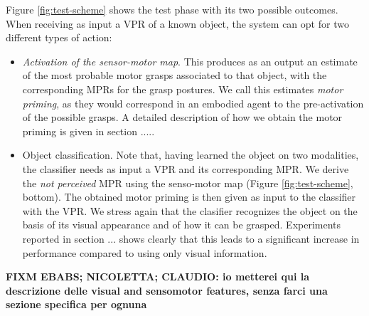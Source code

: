 Figure \ref{fig:test-scheme} shows the test phase with its two possible outcomes. When receiving as input a VPR of a known object, the system can
opt for two different types of action:
\begin{itemize}
\item {\em Activation of the sensor-motor map}. This produces as an output an estimate of the most probable motor grasps associated 
to that object, with the corresponding 
MPRs for the grasp postures. We call this estimates {\em motor priming}, as they would correspond in an embodied agent to the pre-activation of the possible 
grasps. A detailed description of how we obtain the motor priming is given in section .....

\item {Object classification}. Note that, having learned the object on two modalities, the classifier needs as input a VPR and its corresponding MPR. We derive the
{\em not perceived} MPR using the senso-motor map (Figure \ref{fig:test-scheme}, bottom). The obtained motor priming is then given as input to the classifier with the VPR. We stress again that the clasifier recognizes the object on the basis of its visual appearance and of how it can be grasped. Experiments
reported in section ... shows clearly that this leads to a significant increase in performance compared to using only visual information.

\end{itemize}

{\bf FIXM EBABS; NICOLETTA; CLAUDIO: io metterei qui la descrizione delle visual and sensomotor features, senza farci una sezione specifica per ognuna}

